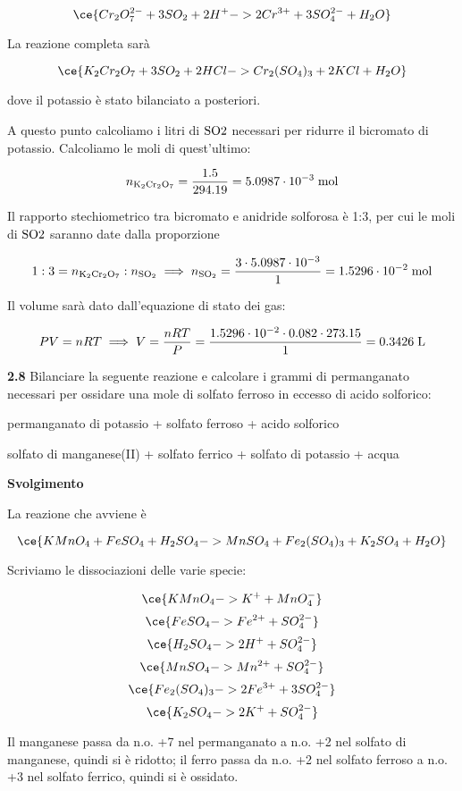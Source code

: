 $$\ce{Cr_2O_7^{2-} + 3SO_2 + 2H^+ -> 2Cr^{3+} + 3SO_4^{2-} + H_2O}$$

La reazione completa sarà

$$\ce{K_2Cr_2O_7 + 3SO_2 + 2HCl -> Cr_2(SO_4)_3 + 2KCl + H_2O}$$

dove il potassio è stato bilanciato a posteriori.

A questo punto calcoliamo i litri di $\rm SO2$ necessari per ridurre il bicromato di potassio. Calcoliamo le moli di quest'ultimo:

$$n_{\rm K_2Cr_2O_7}=\frac{1.5}{294.19}
=5.0987 \cdot 10^{-3} \; \rm mol$$

Il rapporto stechiometrico tra bicromato e anidride solforosa è 1:3, per cui le moli di $\rm SO2$ saranno date dalla proporzione

$$1:3=n_{\rm K_2Cr_2O_7}:n_{\rm SO_2}
\implies
n_{\rm SO_2}=\frac{3 \cdot 5.0987 \cdot 10^{-3}}{1}
=1.5296 \cdot 10^{-2} \; \rm mol$$

Il volume sarà dato dall'equazione di stato dei gas:

$$PV=nRT
\implies
V=\frac{nRT}{P}=\frac{1.5296 \cdot 10^{-2} \cdot 0.082 \cdot 273.15}{1}=0.3426 \; \rm L$$

\vspace{0.2cm}\textbf{2.8} Bilanciare la seguente reazione e calcolare i grammi di permanganato necessari per ossidare una
mole di solfato ferroso in eccesso di acido solforico:

\begin{center}
permanganato di potassio + solfato ferroso + acido solforico \ce{->}

\ce{->}solfato di manganese(II) + solfato ferrico + solfato di potassio + acqua
\end{center}

\large\textbf{Svolgimento}\normalsize

\vspace{0.2cm}La reazione che avviene è

$$\ce{KMnO_4 + FeSO_4 + H_2SO_4 -> MnSO_4 + Fe_2(SO_4)_3 + K_2SO_4 + H_2O}$$

Scriviamo le dissociazioni delle varie specie:

$$\ce{KMnO_4 -> K^+ + MnO_4^-}$$
$$\ce{FeSO_4 -> Fe^{2+} + SO_4^{2-}}$$
$$\ce{H_2SO_4 -> 2H^+ + SO_4^{2-}}$$
$$\ce{MnSO_4 -> Mn^{2+} + SO_4^{2-}}$$
$$\ce{Fe_2(SO_4)_3 -> 2Fe^{3+} + 3SO_4^{2-}}$$
$$\ce{K_2SO_4 -> 2K^+ + SO_4^{2-}}$$

Il manganese passa da n.o. +7 nel permanganato a n.o. +2 nel solfato di manganese, quindi si è ridotto; il ferro passa da n.o. +2 nel solfato ferroso a n.o. +3 nel solfato ferrico, quindi si è ossidato.

